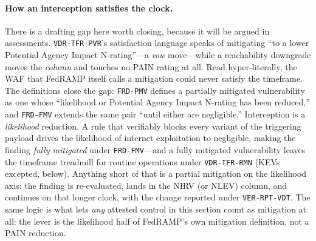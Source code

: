 \documentclass[11pt]{article}
\newcommand{\code}[1]{\texttt{#1}}
\begin{document}
\paragraph{How an interception satisfies the clock.} There is a drafting gap here worth closing, because it will be argued in assessments. \code{VDR-TFR-PVR}'s satisfaction language speaks of mitigating ``to a lower Potential Agency Impact N-rating''---a \emph{row} move---while a reachability downgrade moves the \emph{column} and touches no PAIN rating at all. Read hyper-literally, the WAF that FedRAMP itself calls a mitigation could never satisfy the timeframe. The definitions close the gap: \code{FRD-PMV} defines a partially mitigated vulnerability as one whose ``likelihood or Potential Agency Impact N-rating has been reduced,'' and \code{FRD-FMV} extends the same pair ``until either are negligible.'' Interception is a \emph{likelihood} reduction. A rule that verifiably blocks every variant of the triggering payload drives the likelihood of internet exploitation to negligible, making the finding \emph{fully mitigated} under \code{FRD-FMV}---and a fully mitigated vulnerability leaves the timeframe treadmill for routine operations under \code{VDR-TFR-RMN} (KEVs excepted, below). Anything short of that is a partial mitigation on the likelihood axis: the finding is re-evaluated, lands in the NIRV (or NLEV) column, and continues on that longer clock, with the change reported under \code{VER-RPT-VDT}. The same logic is what lets \emph{any} attested control in this section count as mitigation at all: the lever is the likelihood half of FedRAMP's own mitigation definition, not a PAIN reduction.
\end{document}

